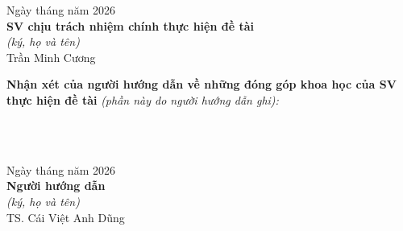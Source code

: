 {\vspace{1.2cm}
\begin{flushright}
Ngày \underline{\quad} tháng \underline{\quad} năm 2026 \\[0.4cm]
\textbf{SV chịu trách nhiệm chính thực hiện đề tài} \\[0.2cm]
\textit{(ký, họ và tên)} \\[1.8cm]
Trần Minh Cương
\end{flushright}

\vspace{0.4cm}
\noindent\textbf{Nhận xét của người hướng dẫn về những đóng góp khoa học của SV thực hiện
đề tài} \textit{(phần này do người hướng dẫn ghi):}

\vspace{0.2cm}
\noindent\dotfill\\[0.6cm]
\noindent\dotfill\\[0.6cm]
\noindent\dotfill

\vspace{1.2cm}
\begin{flushright}
Ngày \underline{\quad} tháng \underline{\quad} năm 2026 \\[0.4cm]
\textbf{Người hướng dẫn} \\[0.2cm]
\textit{(ký, họ và tên)} \\[1.8cm]
TS. Cái Việt Anh Dũng
\end{flushright}

}
